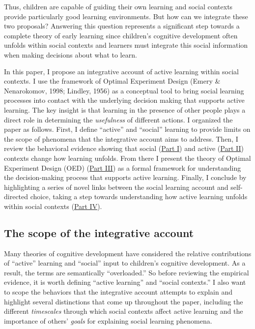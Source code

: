 \documentclass[oneside]{report}
\begin{document}
Thus, children are capable of guiding their own learning and social
contexts provide particularly good learning environments. But how can we
integrate these two proposals? Answering this question represents a
significant step towards a complete theory of early learning since
children's cognitive development often unfolds within social contexts
and learners must integrate this social information when making
decisions about what to learn.

In this paper, I propose an integrative account of active learning
within social contexts. I use the framework of Optimal Experiment Design
(Emery \& Nenarokomov, 1998; Lindley, 1956) as a conceptual tool to
bring social learning processes into contact with the underlying
decision making that supports active learning. The key insight is that
learning in the presence of other people plays a direct role in
determining the \emph{usefulness} of different actions. I organized the
paper as follows. First, I define ``active'' and ``social'' learning to
provide limits on the scope of phenomena that the integrative account
aims to address. Then, I review the behavioral evidence showing that
social (\protect\hyperlink{p1}{Part I}) and active
(\protect\hyperlink{p2}{Part II}) contexts change how learning unfolds.
From there I present the theory of Optimal Experiment Design (OED)
(\protect\hyperlink{p3}{Part III}) as a formal framework for
understanding the decision-making process that supports active learning.
Finally, I conclude by highlighting a series of novel links between the
social learning account and self-directed choice, taking a step towards
understanding how active learning unfolds within social contexts
(\protect\hyperlink{p4}{Part IV}).

\hypertarget{the-scope-of-the-integrative-account}{%
\subsection{The scope of the integrative
account}\label{the-scope-of-the-integrative-account}}

Many theories of cognitive development have considered the relative
contributions of ``active'' learning and ``social'' input to children's
cognitive development. As a result, the terms are semantically
``overloaded.'' So before reviewing the empirical evidence, it is worth
defining ``active learning'' and ``social contexts.'' I also want to
scope the behaviors that the integrative account attempts to explain and
highlight several distinctions that come up throughout the paper,
including the different \emph{timescales} through which social contexts
affect active learning and the importance of others' \emph{goals} for
explaining social learning phenomena.
\end{document}
